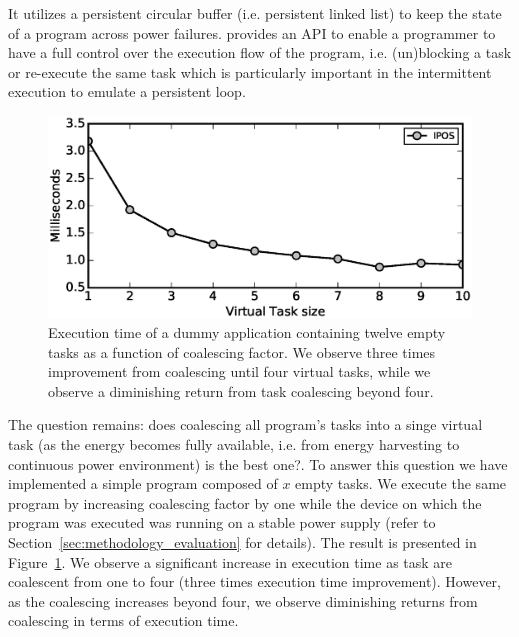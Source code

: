 
It utilizes a persistent circular buffer (i.e. persistent linked list) to keep the state of a program across power failures. \sys provides an API to enable a programmer to have a full control over the execution flow of the program, i.e. (un)blocking a task or re-execute the same task which is particularly important in the intermittent execution to emulate a persistent loop. 

\begin{figure}
	\centering
	\includegraphics[width=\columnwidth]{figures/virtualTaskSize.eps}
	\caption{Execution time of a dummy application containing twelve empty tasks as a function of coalescing factor. We observe three times improvement from coalescing until four virtual tasks, while we observe a diminishing return from task coalescing beyond four. }
	\label{fig:virtualTaskSize}
\end{figure}

The question remains: does coalescing all program's tasks into a singe virtual task (as the energy becomes fully available, i.e. from energy harvesting to continuous power environment) is the best one?. To answer this question we have implemented a simple program composed of $x$ empty tasks. We execute the same program by increasing coalescing factor by one while the device on which the program was executed was running on a stable power supply (refer to Section~\ref{sec:methodology_evaluation} for details). The result is presented in Figure~\ref{fig:virtualTaskSize}. We observe a significant increase in execution time as task are coalescent from one to four (three times execution time improvement). However, as the coalescing increases beyond four, we observe diminishing returns from coalescing in terms of execution time. 

